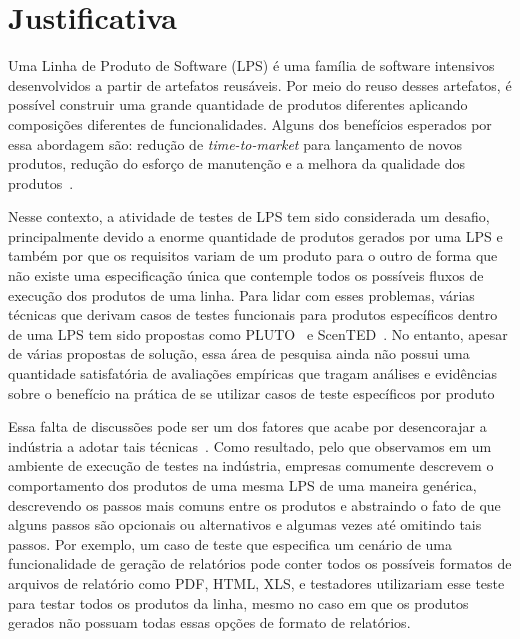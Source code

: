 \section{Justificativa}

\label{sec:justificativa}



Uma Linha de Produto de Software (LPS) é uma família de software intensivos desenvolvidos a partir de artefatos reusáveis. Por meio do reuso desses artefatos, é possível construir uma grande quantidade de produtos diferentes aplicando composições diferentes de funcionalidades. Alguns dos benefícios esperados por essa abordagem são: redução de \emph{time-to-market} para lançamento de novos produtos, redução do esforço de manutenção e a melhora da qualidade dos produtos~\cite{pohl-book}.

Nesse contexto, a atividade de testes de LPS tem sido considerada um desafio,
principalmente devido a enorme quantidade de produtos gerados por uma LPS e
também por que os requisitos variam de um produto para o outro de forma que não
existe uma especificação única que contemple todos os possíveis fluxos de execução dos
produtos de uma linha. Para lidar com esses problemas, várias técnicas que
derivam casos de testes funcionais para produtos específicos dentro de uma LPS
tem sido propostas como PLUTO~\cite{Bertolino:pluto} e
ScenTED~\cite{Pohl:scented}. No entanto, apesar de várias propostas de solução, 
essa área de pesquisa ainda não possui uma quantidade satisfatória de avaliações
empíricas que tragam análises e evidências sobre o benefício na prática de se
utilizar casos de teste específicos por produto

Essa falta de discussões pode ser um dos fatores que acabe por desencorajar a
indústria a adotar tais técnicas~\cite{Tevanlinna:spltesting, Engstrom2011}.
Como resultado, pelo que observamos em um ambiente de execução de testes na
indústria, empresas comumente descrevem o comportamento dos produtos de uma
mesma LPS de uma maneira genérica, descrevendo os passos mais comuns entre os
produtos e abstraindo o fato de que alguns passos são opcionais ou alternativos
e algumas vezes até omitindo tais passos. Por exemplo, um caso de teste que
especifica um cenário de uma funcionalidade de geração de relatórios pode conter
todos os possíveis formatos de arquivos de relatório como PDF, HTML, XLS, e
testadores utilizariam esse teste para testar todos os produtos da linha, mesmo
no caso em que os produtos gerados não possuam todas essas opções de formato de
relatórios. 


